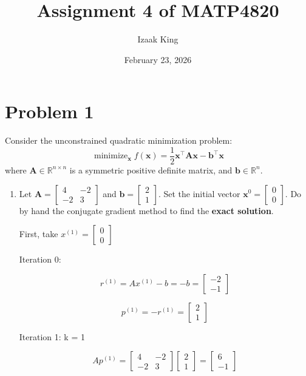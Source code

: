 \documentclass[12pt]{article}
\title{Assignment 4 of MATP4820}
\author{Izaak King}
\date{February 23, 2026}
\newcommand{\vb}{{\mathbf{b}}}
\newcommand{\vx}{{\mathbf{x}}}
\newcommand{\vA}{{\mathbf{A}}}
\newcommand{\RR}{\mathbb{R}}
\DeclareMathOperator*{\Min}{minimize}
\begin{document}
\maketitle

\section*{Problem 1}
Consider the unconstrained quadratic minimization problem:
\begin{equation}\label{eq:quad-min}\tag{QuadMin}
\Min_\vx f(\vx) = \frac{1}{2}\vx^\top \vA \vx - \vb^\top \vx
\end{equation}
where $\vA\in\RR^{n\times n}$ is a symmetric positive definite matrix, and $\vb\in\RR^n$. 
\begin{enumerate}
\item Let $\vA=\left[\begin{array}{cc}4 & -2\\ -2 & 3\end{array}\right]$ and $\vb=\left[\begin{array}{r}2 \\ 1\end{array}\right]$. Set the initial vector $\vx^0=\left[\begin{array}{r}0 \\ 0\end{array}\right]$. Do by hand the conjugate gradient method to find the \textbf{exact solution}. 

\vspace{8mm}

First, take $x^{(1)} = 
\begin{bmatrix}
0 \\
0
\end{bmatrix}$

Iteration 0:

\[ r^{(1)} = Ax^{(1)} - b = -b =
\begin{bmatrix}
-2 \\
-1
\end{bmatrix}\]

\[ p^{(1)} = -r^{(1)} = \begin{bmatrix}
2 \\
1
\end{bmatrix}
\]

Iteration 1: k = 1

\[Ap^{(1)} = \begin{bmatrix}
4 & -2\\
-2 & 3
\end{bmatrix}\begin{bmatrix}
2 \\
1
\end{bmatrix} = \begin{bmatrix}
6 \\
-1
\end{bmatrix} \]


\end{enumerate}
\end{document}
